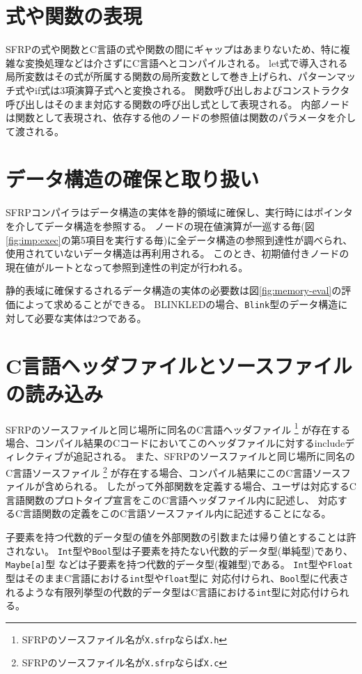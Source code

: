 \section{式や関数の表現}\label{sec:implementation:expression}
SFRPの式や関数とC言語の式や関数の間にギャップはあまりないため、特に複雑な変換処理などは介さずにC言語へとコンパイルされる。
let式で導入される局所変数はその式が所属する関数の局所変数として巻き上げられ、パターンマッチ式やif式は3項演算子式へと変換される。
関数呼び出しおよびコンストラクタ呼び出しはそのまま対応する関数の呼び出し式として表現される。
内部ノードは関数として表現され、依存する他のノードの参照値は関数のパラメータを介して渡される。

\section{データ構造の確保と取り扱い}\label{sec:implementation:data}
SFRPコンパイラはデータ構造の実体を静的領域に確保し、実行時にはポインタを介してデータ構造を参照する。
ノードの現在値演算が一巡する毎(図\ref{fig:imp:exec}の第5項目を実行する毎)に全データ構造の参照到達性が調べられ、使用されていないデータ構造は再利用される。
このとき、初期値付きノードの現在値がルートとなって参照到達性の判定が行われる。

静的表域に確保するされるデータ構造の実体の必要数は図\ref{fig:memory-eval}の評価によって求めることができる。
BLINKLEDの場合、\texttt{Blink}型のデータ構造に対して必要な実体は2つである。

\section{C言語ヘッダファイルとソースファイルの読み込み}
SFRPのソースファイルと同じ場所に同名のC言語ヘッダファイル
\footnote{SFRPのソースファイル名が\texttt{X.sfrp}ならば\texttt{X.h}}
が存在する場合、コンパイル結果のCコードにおいてこのヘッダファイルに対するincludeディレクティブが追記される。
また、SFRPのソースファイルと同じ場所に同名のC言語ソースファイル
\footnote{SFRPのソースファイル名が\texttt{X.sfrp}ならば\texttt{X.c}}
が存在する場合、コンパイル結果にこのC言語ソースファイルが含められる。
したがって外部関数を定義する場合、ユーザは対応するC言語関数のプロトタイプ宣言をこのC言語ヘッダファイル内に記述し、
対応するC言語関数の定義をこのC言語ソースファイル内に記述することになる。

子要素を持つ代数的データ型の値を外部関数の引数または帰り値とすることは許されない。
\texttt{Int}型や\texttt{Bool}型は子要素を持たない代数的データ型(単純型)であり、\texttt{Maybe[a]}型
などは子要素を持つ代数的データ型(複雑型)である。
\texttt{Int}型や\texttt{Float}型はそのままC言語における\texttt{int}型や\texttt{float}型に
対応付けられ、\texttt{Bool}型に代表されるような有限列挙型の代数的データ型はC言語における\texttt{int}型に対応付けられる。


